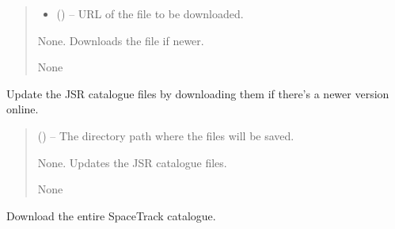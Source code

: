 \documentclass[letterpaper,10pt,english]{sphinxmanual}
\begin{document}
\begin{fulllineitems}
\begin{fulllineitems}
\begin{quote}
\begin{description}
\begin{itemize}
\item {} 
\sphinxAtStartPar
{} () – URL of the file to be downloaded.

\end{itemize}

\sphinxAtStartPar
None. Downloads the file if newer.

\sphinxAtStartPar
None

\end{description}\end{quote}

\end{fulllineitems}


\begin{fulllineitems}
\label{\detokenize{fspsim.utils:fspsim.utils.SpaceCatalogue.SpaceCatalogue.PullCatalogueJSR}}
\pysigstartsignatures
{}
\pysigstopsignatures
\sphinxAtStartPar
Update the JSR catalogue files by downloading them if there’s a newer version online.
\begin{quote}\begin{description}
\sphinxAtStartPar
{} () – The directory path where the files will be saved.

\sphinxAtStartPar
None. Updates the JSR catalogue files.

\sphinxAtStartPar
None

\end{description}\end{quote}

\end{fulllineitems}


\begin{fulllineitems}
\label{\detokenize{fspsim.utils:fspsim.utils.SpaceCatalogue.SpaceCatalogue.PullCatalogueSpaceTrack}}
\pysigstartsignatures
{}
\pysigstopsignatures
\sphinxAtStartPar
Download the entire SpaceTrack catalogue.


\end{fulllineitems}
\end{fulllineitems}
\end{document}
